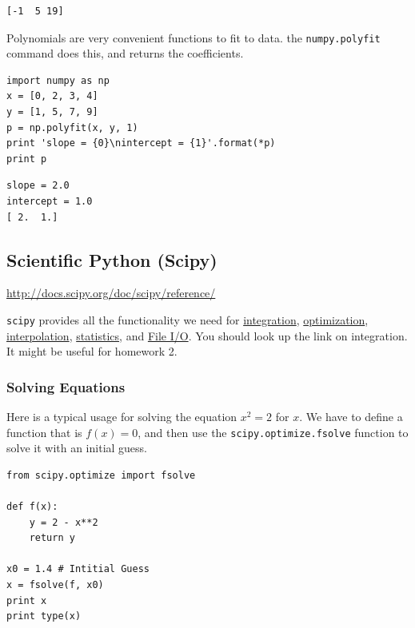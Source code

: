 \documentclass[11pt]{article}
\begin{document}
\begin{verbatim}
[-1  5 19]
\end{verbatim}

Polynomials are very convenient functions to fit to data. the \texttt{numpy.polyfit} command does this, and returns the coefficients.

\begin{verbatim}
import numpy as np
x = [0, 2, 3, 4]
y = [1, 5, 7, 9]
p = np.polyfit(x, y, 1)
print 'slope = {0}\nintercept = {1}'.format(*p)
print p
\end{verbatim}

\begin{verbatim}
slope = 2.0
intercept = 1.0
[ 2.  1.]
\end{verbatim}


\subsection{Scientific Python (Scipy)}
\label{sec-3-12}
\url{http://docs.scipy.org/doc/scipy/reference/}

\texttt{scipy} provides all the functionality we need for \href{http://docs.scipy.org/doc/scipy/reference/tutorial/integrate.html}{integration}, \href{http://docs.scipy.org/doc/scipy/reference/tutorial/optimize.html}{optimization}, \href{http://docs.scipy.org/doc/scipy/reference/tutorial/interpolate.html}{interpolation}, \href{http://docs.scipy.org/doc/scipy/reference/tutorial/stats.html}{statistics}, and \href{http://docs.scipy.org/doc/scipy/reference/tutorial/io.html}{File I/O}. You should look up the link on integration. It might be useful for homework 2.


\subsubsection{Solving Equations}
\label{sec-3-12-1}
Here is a typical usage for solving the equation $x^2 = 2$ for $x$. We have to define a function that is $f(x) = 0$, and then use the \texttt{scipy.optimize.fsolve} function to solve it with an initial guess.

\begin{verbatim}
from scipy.optimize import fsolve

def f(x):
    y = 2 - x**2
    return y

x0 = 1.4 # Intitial Guess
x = fsolve(f, x0)
print x
print type(x)
\end{verbatim}
\end{document}
